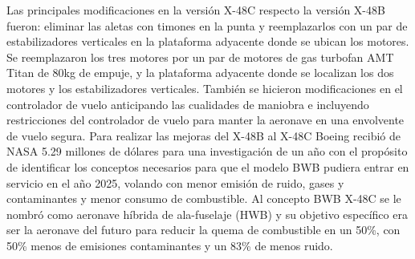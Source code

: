 %
%
Las principales modificaciones en la versión X-48C respecto la versión X-48B fueron: eliminar las aletas con timones en la punta y reemplazarlos con un par de estabilizadores verticales en la plataforma adyacente donde se ubican los motores. Se reemplazaron los tres motores por un par de motores de gas turbofan AMT Titan de 80kg de empuje, y la plataforma adyacente donde se localizan los dos motores y los estabilizadores verticales. 
%
También se hicieron modificaciones en el controlador de vuelo anticipando las cualidades de maniobra e incluyendo restricciones del controlador de vuelo para manter la aeronave en una envolvente de vuelo segura. 
%
Para realizar las mejoras del X-48B al X-48C Boeing recibió de NASA 5.29 millones de dólares para una investigación de un año con el propósito de identificar los conceptos necesarios para que el modelo BWB pudiera entrar en servicio en el año 2025, volando con menor emisión de ruido, gases y contaminantes y menor consumo de combustible. 
%
Al concepto BWB X-48C se le nombró como aeronave híbrida de ala-fuselaje (HWB) y su objetivo específico era ser la aeronave del futuro para reducir la quema de combustible en un 50\%, con 50\% menos de emisiones contaminantes y un 83\% de menos ruido. 
%

\medskip

